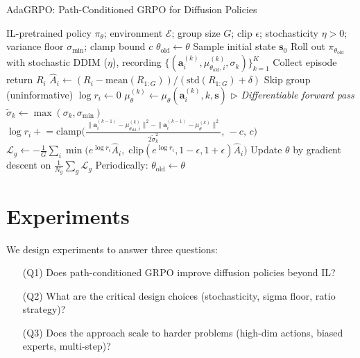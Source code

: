 \documentclass{article}
\newcommand{\ba}{\mathbf{a}}
\newcommand{\bs}{\mathbf{s}}
\begin{document}
\begin{algorithm}[t]
\caption{AdaGRPO: Path-Conditioned GRPO for Diffusion Policies}
\label{alg:adagrpo}
\begin{algorithmic}[1]
\REQUIRE IL-pretrained policy $\pi_\theta$; environment $\mathcal{E}$; group size $G$; clip $\epsilon$; stochasticity $\eta > 0$; variance floor $\sigma_{\min}$; clamp bound $c$
\STATE $\theta_\text{old} \leftarrow \theta$
    \STATE Sample initial state $\bs_0$
      \STATE Roll out $\pi_{\theta_\text{old}}$ with stochastic DDIM ($\eta$), recording $\{(\ba^{(k)}_i, \mu^{(k)}_{\theta_\text{old},i}, \sigma_k)\}_{k=1}^K$
      \STATE Collect episode return $R_i$
    \ENDFOR
    \STATE $\hat{A}_i \leftarrow (R_i - \text{mean}(R_{1:G})) / (\text{std}(R_{1:G}) + \delta)$
     \STATE Skip group (uninformative) \ENDIF
      \STATE $\log r_i \leftarrow 0$
        \STATE $\mu^{(k)}_\theta \leftarrow \mu_\theta(\ba^{(k)}_i, k, \bs)$ \hfill $\triangleright$ \textit{Differentiable forward pass}
        \STATE $\tilde\sigma_k \leftarrow \max(\sigma_k, \sigma_{\min})$
        \STATE $\log r_i \mathrel{+}= \text{clamp}\!\big(\frac{\|\ba^{(k-1)}_i - \mu^{(k)}_{\theta_\text{old},i}\|^2 - \|\ba^{(k-1)}_i - \mu^{(k)}_\theta\|^2}{2\tilde\sigma_k^2},\, -c,\, c\big)$
      \ENDFOR
    \ENDFOR
    \STATE $\mathcal{L}_g \leftarrow -\frac{1}{G}\sum_i \min\!\big(e^{\log r_i} \hat{A}_i,\; \text{clip}(e^{\log r_i}, 1{-}\epsilon, 1{+}\epsilon)\hat{A}_i\big)$
  \ENDFOR
  \STATE Update $\theta$ by gradient descent on $\frac{1}{N_g}\sum_g \mathcal{L}_g$
  \STATE Periodically: $\theta_\text{old} \leftarrow \theta$
\ENDFOR
\end{algorithmic}
\end{algorithm}


\section{Experiments}
\label{sec:experiments}

We design experiments to answer three questions:
\begin{enumerate}
\item[(Q1)] Does path-conditioned GRPO improve diffusion policies beyond IL?
\item[(Q2)] What are the critical design choices (stochasticity, sigma floor, ratio strategy)?
\item[(Q3)] Does the approach scale to harder problems (high-dim actions, biased experts, multi-step)?
\end{enumerate}
\end{document}
